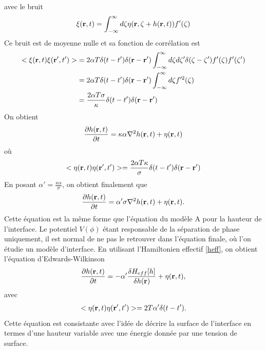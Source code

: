 avec le bruit  
\begin{align}
    \xi({\bf r},t)= \int_{-\infty}^\infty d\zeta \eta({\bf r},\zeta+ h({\bf r},t))f'(\zeta)
\end{align}
Ce bruit est de moyenne nulle et sa fonction de corrélation est
\begin{align}
    < \xi({\bf r},t)\xi({\bf r}',t') > &=2\alpha T\delta(t-t')\delta({\bf r}-{\bf r}')\int_{-\infty}^\infty d\zeta d\zeta' \delta(\zeta-\zeta')f'(\zeta)f'(\zeta')\nonumber \\
    &= 2\alpha T\delta(t-t')\delta({\bf r}-{\bf r}')\int_{-\infty}^\infty d\zeta f'^2(\zeta) \nonumber \\
    &= \frac{2\alpha T\sigma}{\kappa}\delta(t-t')\delta({\bf r}-{\bf r}')
\end{align}
On obtient 
\begin{align}
    \frac{\partial h({\bf r},t)}{\partial t}= \kappa\alpha \nabla^2 h({\bf r},t) + \eta({\bf r},t)
\end{align}
où 
\begin{align}
    < \eta({\bf r},t)\eta({\bf r}',t') > = \frac{2\alpha T\kappa}{\sigma}\delta(t-t')\delta({\bf r}-{\bf r}')
\end{align}
En posant $\alpha' = \frac{\kappa\alpha}{\sigma}$, on obtient finalement que 
\begin{align}
    \frac{\partial h({\bf r},t)}{\partial t}= \alpha' \sigma\nabla^2 h({\bf r},t) + \eta({\bf r},t).
\end{align}
Cette équation est la même forme que l'équation du modèle A pour la hauteur de l'interface. Le potentiel $V(\phi)$ étant responsable de la séparation de phase uniquement, il est normal de ne pas le retrouver dans l'équation finale, où l'on étudie un modèle d'interface. En utilisant l'Hamiltonien effectif \ref{heff}, on obtient l'équation d'Edwards-Wilkinson \cite{edwards_surface_1982}
\begin{align}
    \frac{\partial h({\bf r},t)}{\partial t}= -\alpha' \frac{\delta H_{eff}[h]}{\delta h({\bf r})} + \eta({\bf r},t),
    \label{ew}
\end{align}
avec
\begin{align}
    < \eta({\bf r},t)\eta({\bf r}',t')>= 2T\alpha'\delta(t-t').
\end{align}
Cette équation est consistante avec l'idée de décrire la surface de l'interface en termes d'une hauteur variable avec une énergie donnée par une tension de surface.
%
